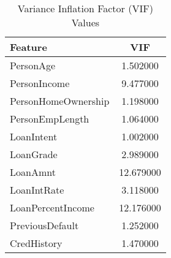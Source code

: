 \begin{table}[H]\centering
\caption{Variance Inflation Factor (VIF) Values}
\label{Table 4:vif_values}
\begin{tabular}{lc}
\toprule
Feature & VIF \\
\midrule
PersonAge & 1.502000 \\
PersonIncome & 9.477000 \\
PersonHomeOwnership & 1.198000 \\
PersonEmpLength & 1.064000 \\
LoanIntent & 1.002000 \\
LoanGrade & 2.989000 \\
LoanAmnt & 12.679000 \\
LoanIntRate & 3.118000 \\
LoanPercentIncome & 12.176000 \\
PreviousDefault & 1.252000 \\
CredHistory & 1.470000 \\
\bottomrule
\end{tabular}
\end{table}
